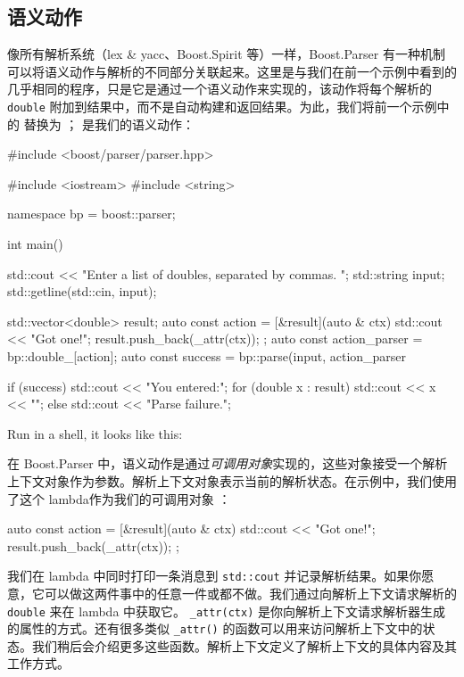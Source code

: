 \subsection{语义动作}

像所有解析系统（lex \& yacc、Boost.Spirit 等）一样，Boost.Parser 有一种机制可以将语义动作与解析的不同部分关联起来。这里是与我们在前一个示例中看到的几乎相同的程序，只是它是通过一个语义动作来实现的，该动作将每个解析的 \texttt{double} 附加到结果中，而不是自动构建和返回结果。为此，我们将前一个示例中的  替换为 ； 是我们的语义动作：

\begin{code}
#include <boost/parser/parser.hpp>

#include <iostream>
#include <string>


namespace bp = boost::parser;

int main()
{
    std::cout << "Enter a list of doubles, separated by commas. ";
    std::string input;
    std::getline(std::cin, input);

    std::vector<double> result;
    auto const action = [&result](auto & ctx) {
        std::cout << "Got one!\n";
        result.push_back(_attr(ctx));
    };
    auto const action_parser = bp::double_[action];
    auto const success = bp::parse(input, action_parser %

    if (success) {
        std::cout << "You entered:\n";
        for (double x : result) {
            std::cout << x << "\n";
        }
    } else {
        std::cout << "Parse failure.\n";
    }
}
\end{code}

Run in a shell, it looks like this:


在 Boost.Parser 中，语义动作是通过\emph{可调用对象}实现的，这些对象接受一个解析上下文对象作为参数。解析上下文对象表示当前的解析状态。在示例中，我们使用了这个 lambda作为我们的可调用对象 ：
\begin{code}
auto const action = [&result](auto & ctx) {
    std::cout << "Got one!\n";
    result.push_back(_attr(ctx));
};
\end{code}
我们在 lambda 中同时打印一条消息到 \texttt{std::cout} 并记录解析结果。如果你愿意，它可以做这两件事中的任意一件或都不做。我们通过向解析上下文请求解析的 \texttt{double} 来在 lambda 中获取它。 \texttt{\_attr(ctx)} 是你向解析上下文请求解析器生成的属性的方式。还有很多类似 \texttt{\_attr()} 的函数可以用来访问解析上下文中的状态。我们稍后会介绍更多这些函数。解析上下文定义了解析上下文的具体内容及其工作方式。

